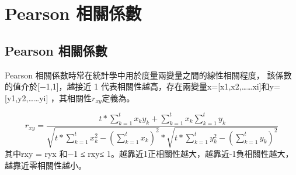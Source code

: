 \chapter{Pearson 相關係數}
\label{chapter:intro}
\section{Pearson 相關係數}
Pearson 相關係數時常在統計學中用於度量兩變量之間的線性相關程度， 該係數的值介於[−1,1]，越接近 1 代表相關性越高，存在兩變量x=[x1,x2,……xi]和y=[y1,y2,……yi] ，其相關性$r_{xy}$定義為。

\begin{equation}
\label{equ:Pearson }
    r_{xy}=\frac{t\ast \sum_{k=1}^{t}x_ky_k+\sum_{k=1}^{t}x_k\sum_{k=1}^{t}y_k}{\sqrt{t\ast \sum_{k=1}^{t}x_k^2-(\sum_{k=1}^{t}x_k)^2}\ast\sqrt{t\ast \sum_{k=1}^{t}y_k^2-(\sum_{k=1}^{t}y_k)^2}}
\end{equation}
其中rxy = ryx 和−1 ≤ rxy≤ 1。越靠近1正相關性越大，越靠近-1負相關性越大，越靠近零相關性越小。
    

